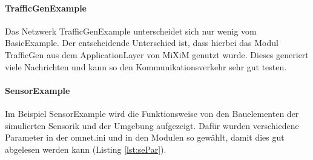 \paragraph{TrafficGenExample}

Das Netzwerk TrafficGenExample unterscheidet sich nur wenig vom BasicExample. Der entscheidende Unterschied ist, dass hierbei das Modul TrafficGen aus dem ApplicationLayer von MiXiM genutzt wurde. Dieses generiert viele Nachrichten und kann so den Kommunikationsverkehr sehr gut testen.

\paragraph{SensorExample}

Im Beispiel SensorExample wird die Funktionsweise von den Bauelementen der simulierten Sensorik und der Umgebung aufgezeigt. Dafür wurden verschiedene Parameter in der omnet.ini und in den Modulen so gewählt, damit dies gut abgelesen werden kann (Listing \ref{lst:sePar}).\\

